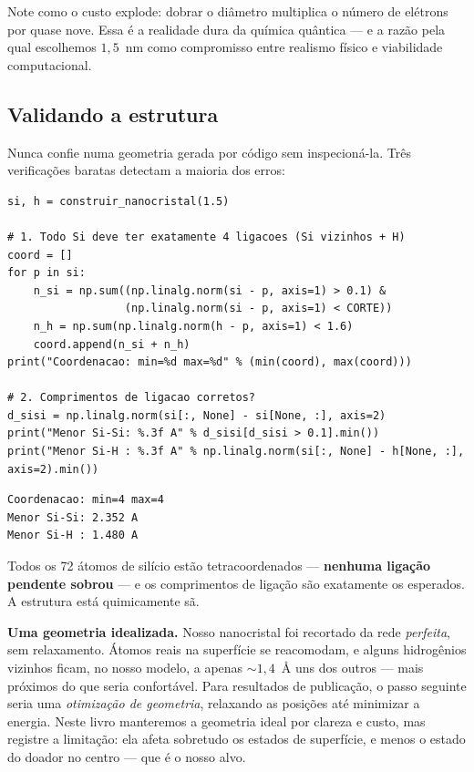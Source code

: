 \noindent
Note como o custo explode: dobrar o diâmetro multiplica o número de elétrons por
quase nove. Essa é a realidade dura da química quântica --- e a razão pela qual
escolhemos $1{,}5$~nm como compromisso entre realismo físico e viabilidade
computacional.

\subsection{Validando a estrutura}

Nunca confie numa geometria gerada por código sem inspecioná-la. Três verificações
baratas detectam a maioria dos erros:

\begin{lstlisting}[style=python,caption={Validando o nanocristal.},label={lst:validar}]
si, h = construir_nanocristal(1.5)

# 1. Todo Si deve ter exatamente 4 ligacoes (Si vizinhos + H)
coord = []
for p in si:
    n_si = np.sum((np.linalg.norm(si - p, axis=1) > 0.1) &
                  (np.linalg.norm(si - p, axis=1) < CORTE))
    n_h = np.sum(np.linalg.norm(h - p, axis=1) < 1.6)
    coord.append(n_si + n_h)
print("Coordenacao: min=%d max=%d" % (min(coord), max(coord)))

# 2. Comprimentos de ligacao corretos?
d_sisi = np.linalg.norm(si[:, None] - si[None, :], axis=2)
print("Menor Si-Si: %.3f A" % d_sisi[d_sisi > 0.1].min())
print("Menor Si-H : %.3f A" % np.linalg.norm(si[:, None] - h[None, :], axis=2).min())
\end{lstlisting}

\begin{lstlisting}[style=console]
Coordenacao: min=4 max=4
Menor Si-Si: 2.352 A
Menor Si-H : 1.480 A
\end{lstlisting}

\noindent
Todos os 72 átomos de silício estão tetracoordenados --- \textbf{nenhuma ligação
pendente sobrou} --- e os comprimentos de ligação são exatamente os esperados.
A estrutura está quimicamente sã.

\begin{caixaatencao}
\textbf{Uma geometria idealizada.} Nosso nanocristal foi recortado da rede
\emph{perfeita}, sem relaxamento. Átomos reais na superfície se reacomodam, e
alguns hidrogênios vizinhos ficam, no nosso modelo, a apenas $\sim 1{,}4$~Å uns
dos outros --- mais próximos do que seria confortável. Para resultados de
publicação, o passo seguinte seria uma \emph{otimização de geometria}, relaxando
as posições até minimizar a energia. Neste livro manteremos a geometria ideal por
clareza e custo, mas registre a limitação: ela afeta sobretudo os estados de
superfície, e menos o estado do doador no centro --- que é o nosso alvo.
\end{caixaatencao}


